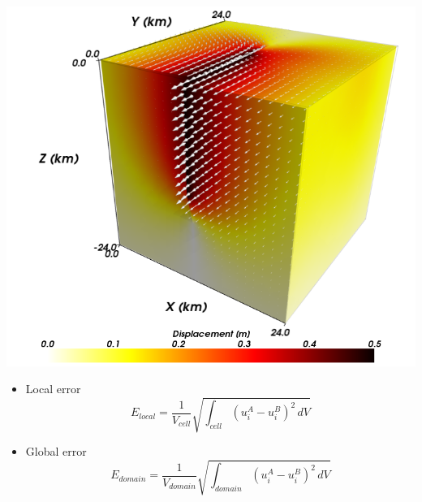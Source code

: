 \documentclass[pdftex,cig,slideColor]{pp4slides}
\begin{document}
  \summary{}


  \vfill
 \begin{center}
    \includegraphics[scale=0.65]{figs/strikeslipnog_soln}
  \end{center}
  \vfill



  \begin{itemize}
  \item Local error
    \begin{equation}
      E_\mathit{local} = \frac{1}{V_\mathit{cell}}
        \sqrt{\int_\mathit{cell} \left( u_i^A - u_i^B \right)^2 \, dV}
    \end{equation}
  \item Global error
    \begin{equation}
      E_\mathit{domain} = \frac{1}{V_\mathit{domain}}
        \sqrt{\int_\mathit{domain} \left( u_i^A - u_i^B \right)^2 \, dV}
    \end{equation}
  \end{itemize}
  
\end{document}
